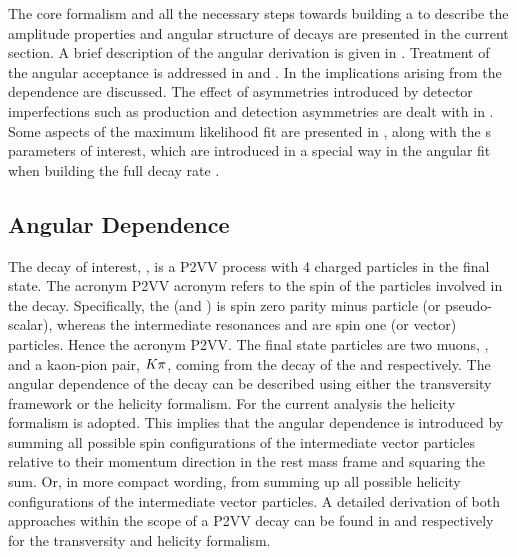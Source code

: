 
The core formalism and all the necessary steps towards building a \pdf to describe the amplitude properties and angular structure of \BJpsiKst decays are presented in
the current section. A brief description of the angular \pdf derivation is given in .
Treatment of the angular acceptance is addressed in  and .
In  the implications arising from the \mkpi dependence are discussed.
The effect of asymmetries introduced by detector imperfections such as production and detection asymmetries are dealt with
in . Some aspects of the maximum likelihood fit are presented in ,
along with the \Acp{} parameters of interest, which are introduced in a special way in the angular fit when building the full decay rate \pdf.


\subsection{Angular Dependence}
\label{Diferential_Decay_Rate}

The decay of interest, \BJpsiKst, is a P2VV process with 4 charged particles in the final state.
The acronym P2VV acronym refers to the spin of the particles involved in the decay.
Specifically, the \Bs (and \Bd) is spin zero parity minus particle (or pseudo-scalar), whereas the intermediate resonances
\jpsi and \Kstarzb are spin one (or vector) particles. Hence the acronym P2VV. The final state particles are
two muons, \mmu, and a kaon-pion pair, $K\pi$, coming from the decay of the \jpsi and \Kstarzb respectively.
The angular dependence of the \BsJpsiKst decay can be described using either the transversity framework\cite{transvFrameworkI,transvFrameworkII}
or the helicity formalism\cite{helicityFormI,helicityFormII}. For the current analysis the helicity
formalism is adopted. This implies that the angular dependence is introduced by summing all possible
spin configurations of the intermediate vector particles relative to their momentum direction in the
\Bs rest mass frame and squaring the sum. Or, in more compact wording, from summing up all possible
helicity configurations of the intermediate vector particles. A detailed derivation of both approaches
within the scope of a P2VV decay can be found in \cite{daanThesis} and \cite{jeroenThesis} respectively
for the transversity and helicity formalism.

